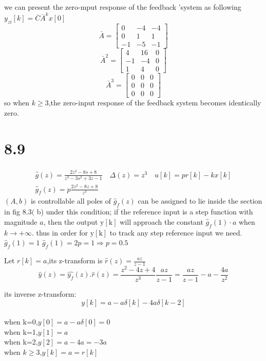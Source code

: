 \documentclass{article}
\begin{document}
we can present the zero-mput response of the feedback 'system
as following $y_{zi}[k]=\overline{C} \bar{A}^{k} x[0]$
\[
    \bar{A}=\left[\begin{array}{ccc}
        0 & -4 & -4 \\
        0 & 1 & 1 \\
        -1 & -5 & -1
        \end{array}\right]    
\]
\[
    \bar{A}^2=\left[\begin{array}{ccc}
        4 & 16 & 0 \\
        -1 & -4 & 0 \\
        1 & 4 & 0
        \end{array}\right]    
\]
\[
    \bar{A}^3=\left[\begin{array}{ccc}
        0 & 0 & 0 \\
        0 & 0 & 0 \\
        0 & 0 & 0
        \end{array}\right]    
\]
so when $k\geq 3$,the zero-input response of the feedback system becomes identically zero.

\section*{8.9}

$$
\begin{array}{l}
\hat{g}(z)=\frac{2 z^{2}-8 s+8}{z^{3}-3 s^{2}+3 z-1} \quad \Delta(z)=z^{3} \quad u[k]=pr[k]-kx[k] \\
\hat{g}_{f}(z)=p \frac{2z^{2}-8 z+8}{z^{3}}
\end{array}
$$
$(A, b)$ is controllable all poles of $\hat{g}_{f}(z)$ can be assigned to lie inside the section in fig $8.3($ b)
under this condition; if the reference input is a step function with magnitude $a$, then the output
$\mathrm{y}[\mathrm{k}]$ will approach the constant $\hat{g}_{f}(1) \cdot a$ when $k \rightarrow+\infty$.
thus in order for $\mathrm{y}[\mathrm{k}]$ to track any step reference input we need. $\hat{g}_{f}(1)=1$
$\hat{g}_{f}(1)=2 p=1 \Rightarrow p=0.5$

Let $r[k]=a$,its z-transform is $\hat{r}(z)=\frac{az}{z-1}$
\[
\hat{y}(z)=\hat{y_f}(z).\hat{r}(z)= \frac{z^{2}-4 z+4}{z^{3}}\frac{az}{z-1}=\frac{az}{z-1}-a-\frac{4a}{z^2} 
\]

its inverse z-transform:
\[y[k]=a-a\delta[k]-4a\delta[k-2]\]\\
when k=0,$y[0]=a-a\delta[0]=0$\\
when k=1,$y[1]=a$\\
when k=2,$y[2]=a-4a=-3a$\\
when $k \geq 3$,$y[k]=a=r[k]$\\
\end{document}
